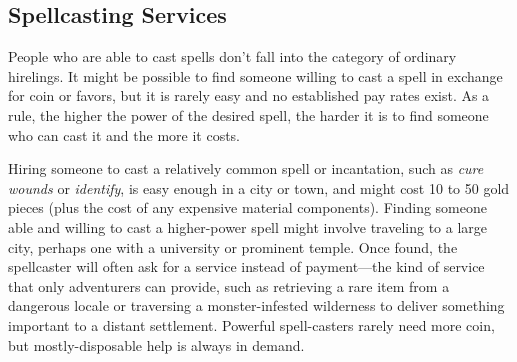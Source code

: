 \subsection{Spellcasting Services}

People who are able to cast spells don't fall into the category of ordinary hirelings. It might be possible to find someone willing to cast a spell in exchange for coin or favors, but it is rarely easy and no established pay rates exist. As a rule, the higher the power of the desired spell, the harder it is to find someone who can cast it and the more it costs.

Hiring someone to cast a relatively common spell or incantation, such as \textit{cure wounds} or \textit{identify}, is easy enough in a city or town, and might cost 10 to 50 gold pieces (plus the cost of any expensive material components). Finding someone able and willing to cast a higher-power spell might involve traveling to a large city, perhaps one with a university or prominent temple. Once found, the spellcaster will often ask for a service instead of payment---the kind of service that only adventurers can provide, such as retrieving a rare item from a dangerous locale or traversing a monster-infested wilderness to deliver something important to a distant settlement. Powerful spell-casters rarely need more coin, but mostly-disposable help is always in demand.
